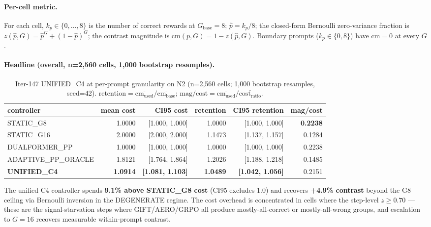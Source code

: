\paragraph{Per-cell metric.} For each cell, $k_p \in \{0,\ldots,8\}$ is the
number of correct rewards at $G_{\mathrm{base}}{=}8$; $\hat p = k_p/8$; the
closed-form Bernoulli zero-variance fraction is $z(\hat p, G) = \hat p^G +
(1-\hat p)^G$; the contrast magnitude is $\mathrm{cm}(p, G) = 1 - z(\hat p, G)$.
Boundary prompts ($k_p \in \{0, 8\}$) have $\mathrm{cm} = 0$ at every $G$.

\paragraph{Headline (overall, n=2,560 cells, 1,000 bootstrap resamples).}

\begin{table}[ht]
\centering
\small
\caption{Iter-147 UNIFIED\_C4 at per-prompt granularity on N2 (n=2,560 cells; 1,000 bootstrap resamples, seed=42).
$\mathrm{retention} = \overline{\mathrm{cm}_{\mathrm{used}}}/\overline{\mathrm{cm}_{\mathrm{base}}}$;
$\mathrm{mag/cost} = \overline{\mathrm{cm}_{\mathrm{used}}}/\overline{\mathrm{cost}_{\mathrm{ratio}}}$.
}
\label{tab:p7-iter147-headline}
\begin{tabular}{lrrrrr}
\toprule
controller & mean cost & CI95 cost & retention & CI95 retention & mag/cost \\
\midrule
STATIC\_G8          & 1.0000 & [1.000, 1.000] & 1.0000  & [1.000, 1.000] & \textbf{0.2238} \\
STATIC\_G16         & 2.0000 & [2.000, 2.000] & 1.1473  & [1.137, 1.157] & 0.1284 \\
DUALFORMER\_PP      & 1.0000 & [1.000, 1.000] & 1.0000  & [1.000, 1.000] & 0.2238 \\
ADAPTIVE\_PP\_ORACLE& 1.8121 & [1.764, 1.864] & 1.2026  & [1.188, 1.218] & 0.1485 \\
\textbf{UNIFIED\_C4}& \textbf{1.0914} & \textbf{[1.081, 1.103]} & \textbf{1.0489} & \textbf{[1.042, 1.056]} & 0.2151 \\
\bottomrule
\end{tabular}
\end{table}

The unified C4 controller spends \textbf{9.1\% above STATIC\_G8 cost} (CI95 excludes 1.0)
and recovers \textbf{+4.9\% contrast} beyond the G8 ceiling via Bernoulli inversion in
the DEGENERATE regime. The cost overhead is concentrated in cells where the
step-level $z \geq 0.70$ --- these are the signal-starvation steps where GIFT/AERO/GRPO
all produce mostly-all-correct or mostly-all-wrong groups, and escalation to
$G{=}16$ recovers measurable within-prompt contrast.


